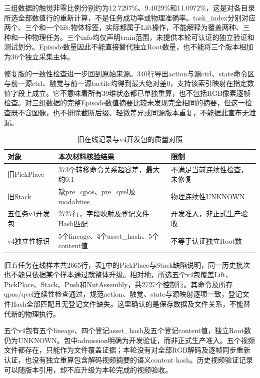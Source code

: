 三组数据的触觉非零比例分别约为12.7297\%、9.4029\%和11.0972\%，这是对各目录所选全部数值行的重新计算，不是任务成功率或物理准确率。task\_index分别对应两个、三个和一个lift:物体标签，实际都属于Lift操作，不能解释为覆盖两种、三种和一种物理任务。三个info均仅声明train范围，未提供本轮可认证的独立验证和测试划分。Episode数量因此不能直接替代独立Root数量，也不能将三个版本相加为36个独立采集主体。

修复版的一致性检查进一步回到原始来源。340行导出action与源ctrl、state命令区与前一源ctrl、触觉与前一源tactile均得到最大绝对差0，支持该索引映射在指定数值字段上成立。它不意味着所有39维状态都已单独重算，也不包括RGB像素逐帧检查。对三组数据的完整Episode数值摘要比较未发现完全相同的摘要，但这一检查既不含图像，也不排除截断后缀、轻微差异或同源版本重复，不能据此宣布无泄漏。

\begin{table}[htbp]
 \centering\small
 \caption{旧在线记录与v4开发包的质量对照}
 \label{tab:ch04_version_quality}
 \begin{tabular}{p{}p{}p{}}
 \hline
 对象 & 本次材料核验结果 & 限制\\
 \hline
 旧PickPlace & 373个转移命令关系超容差，最大约0.1 & 不满足当前连续性检查，未修复\\
 旧Stack & 缺pre\_qpos、pre\_qvel及modalities & 物理连续性UNKNOWN\\
 五任务v4开发包 & 2727行，字段映射及登记文件Hash匹配 & 开发准入，非正式生产验收\\
 v4独立性标识 & 5个lineage、4个asset\_hash、5个content值 & 不等于认证独立Root数\\
 \hline
 \end{tabular}
\end{table}

旧五任务在线样本共2665行，表\ref{tab:ch04_version_quality}中的PickPlace与Stack缺陷说明，同一历史批次也不能只依据某个样本通过就整体升级。相对地，所选五个v4包覆盖Lift、PickPlace、Stack、Push和NutAssembly，共2727个控制行。其命令及所存qpos/qvel连续性检查通过，规范action、触觉、state与源映射逐项一致，登记文件Hash全部匹配且无登记文件缺失。这里确认的是保存数据及文件关系，不能替代新的物理执行。

五个v4包有五个lineage、四个登记asset\_hash及五个登记content值，独立Root数仍为UNKNOWN。包中admission明确为开发验证，而非正式生产准入。五个视频文件都存在，只能作为文件覆盖证据；本轮没有对全部RGB解码及逐帧同步重新认证，也没有独立重算包含解码视频摘要的语义content hash。历史视频验证记录可以随版本引用，却不应升级为本轮完成的视频验收。

